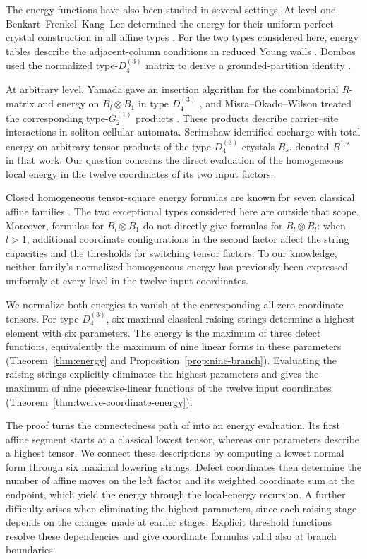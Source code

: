 \documentclass[11pt,reqno]{amsart}
\numberwithin{table}{section}
\numberwithin{equation}{section}
\theoremstyle{plain}
\theoremstyle{definition}
\begin{document}
The energy functions have also been studied in several settings.
At level one, Benkart--Frenkel--Kang--Lee determined the energy for their uniform perfect-crystal construction in all affine types \cite{BFKL}.
For the two types considered here, energy tables describe the adjacent-column conditions in reduced Young walls \cite{FHKS}.
Dombos used the normalized type-\(D_4^{(3)}\) matrix to derive a grounded-partition identity \cite{Dombos}.

At arbitrary level, Yamada gave an insertion algorithm for the combinatorial \(R\)-matrix and energy on \(B_l\otimes B_1\) in type \(D_4^{(3)}\) \cite{YamadaSCA}, and Misra--Okado--Wilson treated the corresponding type-\(G_2^{(1)}\) products \cite{MOW}.
These products describe carrier--site interactions in soliton cellular automata.
Scrimshaw \cite{Scrimshaw2016} identified cocharge with total energy on arbitrary tensor products of the type-\(D_4^{(3)}\) crystals \(B_s\), denoted \(B^{1,s}\) in that work.
Our question concerns the direct evaluation of the homogeneous local energy in the twelve coordinates of its two input factors.

Closed homogeneous tensor-square energy formulas are known for seven classical affine families \cite{HanClassical}.
The two exceptional types considered here are outside that scope.
Moreover, formulas for \(B_l\otimes B_1\) do not directly give formulas for \(B_l\otimes B_l\): when \(l>1\), additional coordinate configurations in the second factor affect the string capacities and the thresholds for switching tensor factors.
To our knowledge, neither family's normalized homogeneous energy has previously been expressed uniformly at every level in the twelve input coordinates.

We normalize both energies to vanish at the corresponding all-zero coordinate tensors.
For type \(D_4^{(3)}\), six maximal classical raising strings determine a highest element with six parameters.
The energy is the maximum of three defect functions, equivalently the maximum of nine linear forms in these parameters (Theorem~\ref{thm:energy} and Proposition~\ref{prop:nine-branch}).
Evaluating the raising strings explicitly eliminates the highest parameters and gives the maximum of nine piecewise-linear functions of the twelve input coordinates (Theorem~\ref{thm:twelve-coordinate-energy}).

The proof turns the connectedness path of \cite[Section~7.1]{KMOY} into an energy evaluation.
Its first affine segment starts at a classical lowest tensor, whereas our parameters describe a highest tensor.
We connect these descriptions by computing a lowest normal form through six maximal lowering strings.
Defect coordinates then determine the number of affine moves on the left factor and its weighted coordinate sum at the endpoint, which yield the energy through the local-energy recursion.
A further difficulty arises when eliminating the highest parameters, since each raising stage depends on the changes made at earlier stages.
Explicit threshold functions resolve these dependencies and give coordinate formulas valid also at branch boundaries.
\end{document}

